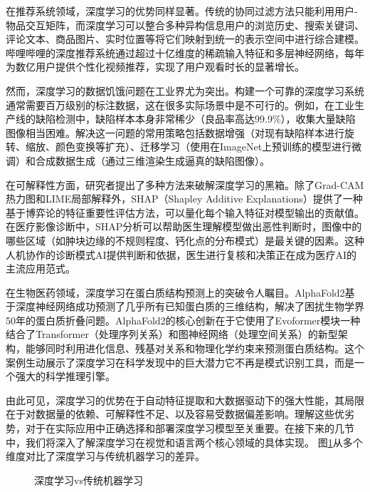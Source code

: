 在推荐系统领域，深度学习的优势同样显著。传统的协同过滤方法只能利用用户-物品交互矩阵，而深度学习可以整合多种异构信息用户的浏览历史、搜索关键词、评论文本、商品图片、实时位置等将它们映射到统一的表示空间中进行综合建模。哔哩哔哩的深度推荐系统通过超过十亿维度的稀疏输入特征和多层神经网络，每年为数亿用户提供个性化视频推荐，实现了用户观看时长的显著增长。

然而，深度学习的数据饥饿问题在工业界尤为突出。构建一个可靠的深度学习系统通常需要百万级别的标注数据，这在很多实际场景中是不可行的。例如，在工业生产线的缺陷检测中，缺陷样本本身非常稀少（良品率高达99.9\%），收集大量缺陷图像相当困难。解决这一问题的常用策略包括数据增强（对现有缺陷样本进行旋转、缩放、颜色变换等扩充）、迁移学习（使用在ImageNet上预训练的模型进行微调）和合成数据生成（通过三维渲染生成逼真的缺陷图像）。

在可解释性方面，研究者提出了多种方法来破解深度学习的黑箱。除了Grad-CAM热力图和LIME局部解释外，SHAP（Shapley Additive Explanations）提供了一种基于博弈论的特征重要性评估方法，可以量化每个输入特征对模型输出的贡献值。在医疗影像诊断中，SHAP分析可以帮助医生理解模型做出恶性判断时，图像中的哪些区域（如肿块边缘的不规则程度、钙化点的分布模式）是最关键的因素。这种人机协作的诊断模式AI提供判断和依据，医生进行复核和决策正在成为医疗AI的主流应用范式。



在生物医药领域，深度学习在蛋白质结构预测上的突破令人瞩目。AlphaFold2基于深度神经网络成功预测了几乎所有已知蛋白质的三维结构，解决了困扰生物学界50年的蛋白质折叠问题。AlphaFold2的核心创新在于它使用了Evoformer模块一种结合了Transformer（处理序列关系）和图神经网络（处理空间关系）的新型架构，能够同时利用进化信息、残基对关系和物理化学约束来预测蛋白质结构。这个案例生动展示了深度学习在科学发现中的巨大潜力它不再是模式识别工具，而是一个强大的科学推理引擎。

由此可见，深度学习的优势在于自动特征提取和大数据驱动下的强大性能，其局限在于对数据量的依赖、可解释性不足、以及容易受数据偏差影响。理解这些优劣势，对于在实际应用中正确选择和部署深度学习模型至关重要。在接下来的几节中，我们将深入了解深度学习在视觉和语言两个核心领域的具体实现。
图\ref{fig:ch2_2_12}从多个维度对比了深度学习与传统机器学习的差异。


\begin{figure}[H]
\centering
{}
\caption{深度学习vs传统机器学习}
\label{fig:ch2_2_12}
\end{figure}







